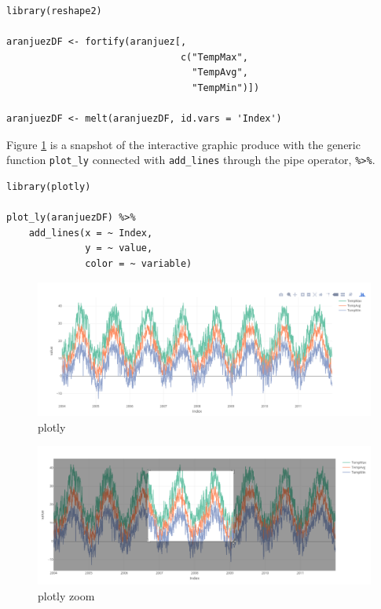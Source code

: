 \documentclass[smallroyalvopaper]{memoir}
\begin{document}
\lstset{language=r,label= ,caption= ,captionpos=b,numbers=none}
\begin{lstlisting}
library(reshape2)

aranjuezDF <- fortify(aranjuez[,
                               c("TempMax",
                                 "TempAvg",
                                 "TempMin")])

aranjuezDF <- melt(aranjuezDF, id.vars = 'Index')
\end{lstlisting}

Figure \ref{fig:plotly} is a snapshot of the interactive graphic produce
with the generic function \texttt{plot\_ly} connected with \texttt{add\_lines} through
the pipe operator, \texttt{\%>\%}.
\lstset{language=r,label= ,caption= ,captionpos=b,numbers=none}
\begin{lstlisting}
library(plotly)

plot_ly(aranjuezDF) %>%
    add_lines(x = ~ Index,
              y = ~ value,
              color = ~ variable)

\end{lstlisting}

\begin{figure}[htbp]
\centering
\includegraphics[width=.9\linewidth]{figs/plotly_aranjuez.png}
\caption{plotly \label{fig:plotly}}
\end{figure}

\begin{figure}[htbp]
\centering
\includegraphics[width=.9\linewidth]{figs/plotly_aranjuez_zoom.png}
\caption{plotly zoom \label{fig:plotly_zoom}}
\end{figure}
\end{document}
